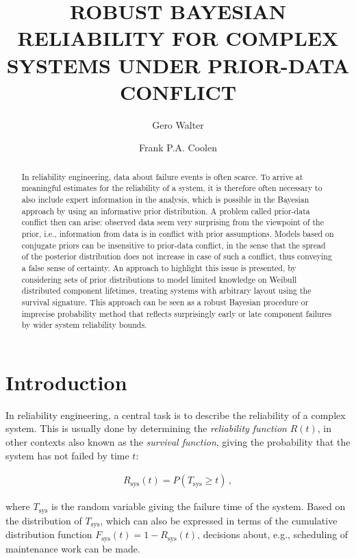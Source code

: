 \documentclass[Journal,letterpaper]{ascelike-new}
\newcommand{\Rsys}{R_\text{sys}}
\def\Rsys{R_\text{sys}}
\def\Tsys{T_\text{sys}}
\begin{document}
\title{ROBUST BAYESIAN RELIABILITY FOR COMPLEX SYSTEMS UNDER PRIOR-DATA CONFLICT}

\author[1]{Gero Walter}
\author[2]{Frank P.A. Coolen}


\maketitle

\begin{abstract}
In reliability engineering, data about failure events is often scarce.
To arrive at meaningful estimates for the reliability of a system,
it is therefore often necessary to also include expert information in the analysis,
which is possible in the Bayesian approach by using an informative prior distribution.
%
A problem called prior-data conflict then can arise:
observed data seem very surprising from the viewpoint of the prior,
i.e., information from data is in conflict with prior assumptions.
Models based on conjugate priors can be insensitive to prior-data conflict,
in the sense that the spread of the posterior distribution does not increase in case of such a conflict,
thus conveying a false sense of certainty.
%
An approach to highlight this issue is presented, by considering sets of prior distributions
to model limited knowledge on Weibull distributed component lifetimes,
treating systems with arbitrary layout using the survival signature.
This approach can be seen as a robust Bayesian procedure or imprecise probability method
that reflects surprisingly early or late component failures
by wider system reliability bounds.
\end{abstract}



\section{Introduction}
\label{sec:intro}
%
In reliability engineering, a central task is to describe the reliability of a complex system.
This is usually done by determining the \emph{reliability function} $R(t)$,
in other contexts also known as the \emph{survival function},
giving the probability that the system has not failed by time $t$:
\begin{linenomath*}
\begin{align}
\Rsys(t) = P(\Tsys \geq t)\,,
\end{align}
\end{linenomath*}
where $\Tsys$ is the random variable giving the failure time of the system. %
Based on the distribution of $\Tsys$, which can also be expressed
in terms of the cumulative distribution function $F_\text{sys}(t) = 1 - \Rsys(t)$,
decisions about, e.g., scheduling of maintenance work can be made.
\end{document}
